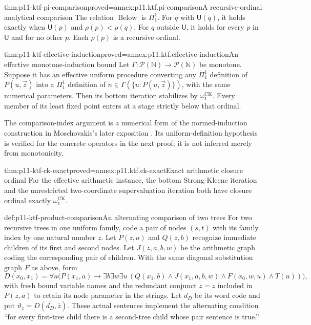 \begin{hblemma}{thm:p11-ktf-pi-comparison}{proved=annex:p11.ktf.pi-comparison}{A recursive-ordinal analytical comparison}
The relation \(\operatorname{Below}\) is \(\Pi^1_1\). For
\(q\) with \(\mathsf U(q)\), it holds exactly when
\(\mathsf U(p)\) and \(\rho(p)<\rho(q)\). For \(q\) outside
\(\mathsf U\), it holds for every \(p\) in \(\mathsf U\) and
for no other \(p\). Each \(\rho(p)\) is a recursive ordinal.
\end{hblemma}

\begin{hbtheorem}{thm:p11-ktf-effective-induction}{proved=annex:p11.ktf.effective-induction}{An effective monotone-induction bound}
Let \(\Gamma:\mathcal P(\mathbb N)\to\mathcal P(\mathbb N)\)
be monotone. Suppose it has an effective uniform procedure converting
any \(\Pi^1_1\) definition of \(P(u,\vec z)\) into a
\(\Pi^1_1\) definition of
\(n\in\Gamma(\{u:P(u,\vec z)\})\), with the same numerical
parameters. Then its bottom iteration stabilizes by
\(\omega_1^{\mathrm{CK}}\). Every member of its least fixed
point enters at a stage strictly below that ordinal.
\end{hbtheorem}

The comparison-index argument is a numerical form of the normed-induction
construction in Moschovakis's later exposition
\cite[7C.8]{Moschovakis2009DSTAuthor}. Its uniform-definition hypothesis
is verified for the concrete operators in the next proof; it is not
inferred merely from monotonicity.

\begin{hbtheorem}{thm:p11-ktf-ck-exact}{proved=annex:p11.ktf.ck-exact}{Exact arithmetic closure ordinal}
For the effective arithmetic instance, the bottom Strong-Kleene
iteration and the unrestricted two-coordinate supervaluation iteration
both have closure ordinal exactly \(\omega_1^{\mathrm{CK}}\).
\end{hbtheorem}

\begin{hbdefinition}{def:p11-ktf-product-comparison}{An alternating comparison of two trees}
For two recursive trees in one uniform family, code a pair of nodes
\((s,t)\) with its family index by one natural number \(z\).
Let \(P(z,a)\) and \(Q(z,b)\) recognize immediate children of its
first and second nodes. Let \(J(z,a,b,w)\) be the arithmetic graph
coding the corresponding pair of children. With the same diagonal
substitution graph \(F\) as above, form
\[
 D(x_0,x_1)=\forall a\bigl(P(x_1,a)\to
   \exists b\exists w\exists u\,
   (Q(x_1,b)\land J(x_1,a,b,w)\land F(x_0,w,u)\land T(u))\bigr),
\]
with fresh bound variable names and the redundant conjunct \(z=z\)
included in \(P(z,a)\) to retain its node parameter in the strings.
Let \(d_D\) be its word code and put
\(\vartheta_z=D(\overline{d_D},\bar z)\).
These actual sentences implement the alternating condition
``for every first-tree child there is a second-tree child whose pair
sentence is true.''
\end{hbdefinition}

